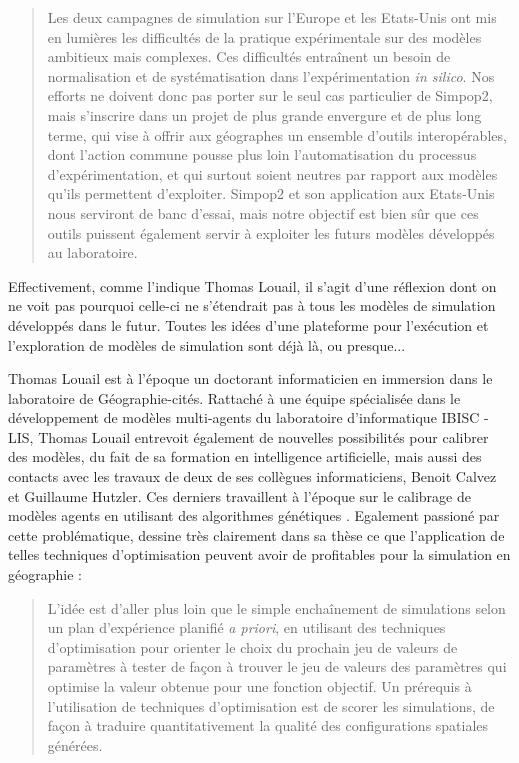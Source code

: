\blockquote[{\cite[132]{Louail2010}}]{Les deux campagnes de simulation sur l’Europe et les Etats-Unis ont mis en lumières les difficultés de la pratique expérimentale sur des modèles ambitieux mais complexes. Ces difficultés entraînent un besoin de normalisation et de systématisation dans l’expérimentation \textit{in silico}. Nos efforts ne doivent donc pas porter sur le seul cas particulier de Simpop2, mais s’inscrire dans un projet de plus grande envergure et de plus long terme, qui vise à offrir aux géographes un ensemble d’outils interopérables, dont l’action commune pousse plus loin l’automatisation du processus d’expérimentation, et qui surtout soient neutres par rapport aux modèles qu’ils permettent d’exploiter. Simpop2 et son application aux Etats-Unis nous serviront de banc d'essai, mais notre objectif est bien sûr que ces outils puissent également servir à exploiter les futurs modèles développés au laboratoire.} 

Effectivement, comme l'indique Thomas Louail, il s'agit d'une réflexion dont on ne voit pas pourquoi celle-ci ne s'étendrait pas à tous les modèles de simulation développés dans le futur. Toutes les idées d'une plateforme pour l'exécution et l'exploration de modèles de simulation sont déjà là, ou presque...

Thomas Louail est à l'époque un doctorant informaticien en immersion dans le laboratoire de Géographie-cités. Rattaché à une équipe spécialisée dans le développement de modèles multi-agents du laboratoire d'informatique IBISC - LIS, Thomas Louail entrevoit également de nouvelles possibilités pour calibrer des modèles, du fait de sa formation en intelligence artificielle, mais aussi des contacts avec les travaux de deux de ses collègues informaticiens, Benoit Calvez et Guillaume Hutzler. Ces derniers travaillent à l'époque sur le calibrage de modèles agents en utilisant des algorithmes génétiques \autocites{Calvez2005,Calvez2007}. Egalement passioné par cette problématique, \textcite[139-141]{Louail2010} dessine très clairement dans sa thèse ce que l'application de telles techniques d'optimisation peuvent avoir de profitables pour la simulation en géographie :

\blockquote[{\cite[139-141]{Louail2010}}]{L’idée est d’aller plus loin que le simple enchaînement de simulations selon un plan d’expérience planifié \textit{a priori}, en utilisant des techniques d’optimisation pour orienter le choix du prochain jeu de valeurs de paramètres à tester de façon à trouver le jeu de valeurs des paramètres qui optimise la valeur obtenue pour une fonction objectif. Un prérequis à l’utilisation de techniques d’optimisation est de scorer les simulations, de façon à traduire quantitativement la qualité des configurations spatiales générées.}

